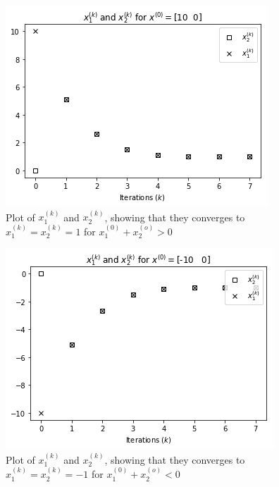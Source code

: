 \documentclass[12pt, a4paper,usenames,dvipsnames]{article}
\begin{document}
\begin{figure}
    \centering
    \includegraphics[width=\linewidth]{x1x2.png}
    \caption{Plot of \(x_1^{(k)}\) and \(x_2^{(k)}\), showing that they converges to \(x_1^{(k)}=x_2^{(k)}=1\) for \(x_1^{(0)}+x_2^{(o)}>0\)}
    \label{fig:x1x2pos}
\end{figure}
\begin{figure}
    \centering
    \includegraphics[width=\linewidth]{x1x2neg.png}
    \caption{Plot of \(x_1^{(k)}\) and \(x_2^{(k)}\), showing that they converges to \(x_1^{(k)}=x_2^{(k)}=-1\) for \(x_1^{(0)}+x_2^{(o)}<0\)}
    \label{fig:x1x2neg}
\end{figure}
\end{document}
